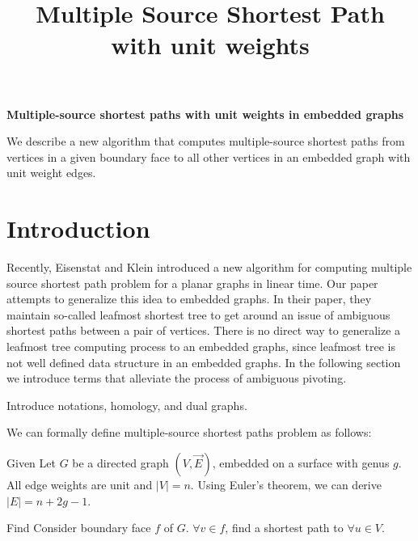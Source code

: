 \documentclass{article}
\begin{document}
\title{Multiple Source Shortest Path with unit weights}

\begin{center}
\textbf{\large Multiple-source shortest paths with unit weights in embedded
graphs}
\end{center}

\DRAFT

\begin{bigabstract}
We describe a new algorithm that computes multiple-source shortest paths from
vertices in a given boundary face to all other vertices in an embedded graph
with unit weight edges.
\end{bigabstract}

\section{Introduction}

Recently, Eisenstat and Klein \cite{eisenstat2013linear} introduced a new algorithm for computing
multiple source shortest path problem for a planar graphs in linear time. Our 
paper attempts to generalize this idea to embedded graphs. In their paper,
they maintain so-called leafmost shortest tree to get around an issue of 
ambiguous shortest paths between a pair of vertices. There is no direct way 
to generalize a leafmost tree computing process to an embedded graphs, since 
leafmost tree is not well defined data structure in an embedded graphs. 
In the following section we introduce terms that alleviate
the process of ambiguous pivoting.\\

\begin{center}
{\color{red}Introduce notations, homology, and dual graphs.}
\end{center}

We can formally define multiple-source shortest paths problem as follows: \\

\begin{oneshot}{Given}
Let $G$ be a directed graph $(V, \vec{E})$, embedded on a surface with genus $g$.
All edge weights are unit and $|V| = n$. Using Euler's theorem, we can derive 
$|E| = n + 2g - 1$.
\end{oneshot}

\begin{oneshot}{Find}
Consider boundary face $f$ of $G$. $\forall v \in f$, find a shortest path to
$\forall u \in V$.
\end{oneshot}
\end{document}
